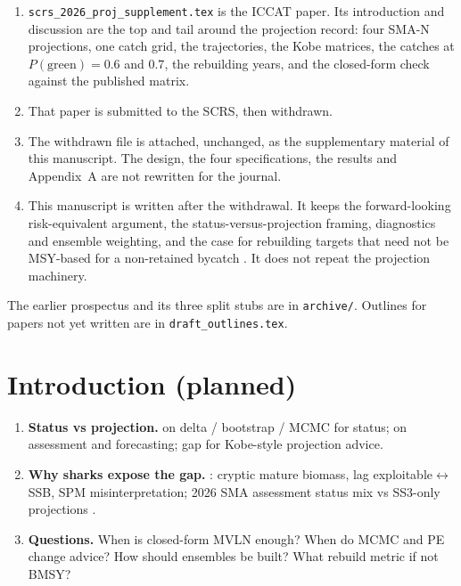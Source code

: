 \documentclass[11pt,a4paper]{article}
\newcommand{\PG}{P(\mathrm{green})}
\begin{document}
\begin{enumerate}[leftmargin=*]
  \item \texttt{scrs\_2026\_proj\_supplement.tex} is the ICCAT paper. Its
    introduction and discussion are the top and tail around the projection
    record: four SMA-N projections, one catch grid, the trajectories, the
    Kobe matrices, the catches at $\PG = 0.6$ and $0.7$, the rebuilding
    years, and the closed-form check against the published matrix.
  \item That paper is submitted to the SCRS, then withdrawn.
  \item The withdrawn file is attached, unchanged, as the supplementary
    material of this manuscript. The design, the four specifications, the
    results and Appendix~A are not rewritten for the journal.
  \item This manuscript is written after the withdrawal. It keeps the
    forward-looking risk-equivalent argument, the status-versus-projection
    framing, diagnostics and ensemble weighting, and the case for rebuilding
    targets that need not be MSY-based for a non-retained bycatch
    \citep{SharkWG2026,KellAcceptedFaF}. It does not repeat the projection
    machinery.
\end{enumerate}

The earlier prospectus and its three split stubs are in \texttt{archive/}.
Outlines for papers not yet written are in \texttt{draft\_outlines.tex}.

\section{Introduction (planned)}

\begin{enumerate}[leftmargin=*]
  \item \textbf{Status vs projection.} \citet{Magnusson2013} on delta /
    bootstrap / MCMC for status; \citet{Patterson2001} on assessment and
    forecasting; gap for Kobe-style projection advice.
  \item \textbf{Why sharks expose the gap.} \citet{Winker2020SMA}: cryptic
    mature biomass, lag exploitable$\leftrightarrow$SSB, SPM misinterpretation;
    2026 SMA assessment status mix vs SS3-only projections
    \citep{SharkWG2026}.
  \item \textbf{Questions.} When is closed-form MVLN enough? When do MCMC and
    PE change advice? How should ensembles be built? What rebuild metric if
    not BMSY?
\end{enumerate}
\end{document}
